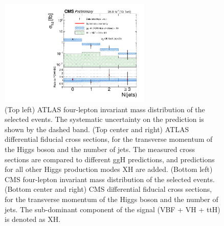 \documentclass[10pt]{article}
\begin{document}
\begin{figure}[htb]
\includegraphics[height=2in]{figures/CMS-HIG-16-041__Figure_009-c__njets.pdf}
\caption{
  (Top left) ATLAS four-lepton invariant mass distribution of the selected
  events. The systematic uncertainty on the prediction is shown by the dashed
  band.
  (Top center and right) ATLAS differential fiducial cross sections, for the
  transverse momentum of the Higgs boson and the number of jets.
  The measured cross sections are compared to different ggH predictions, and
  predictions for all other Higgs production modes XH are added.
  (Bottom left) CMS four-lepton invariant mass distribution of the selected
  events.
  (Bottom center and right) CMS differential fiducial cross sections, for the
  transverse momentum of the Higgs boson and the number of jets.
  The sub-dominant component of the signal (VBF + VH + ttH) is denoted as XH.
}
\label{fig:figure-ZZ}
\end{figure}
\end{document}
